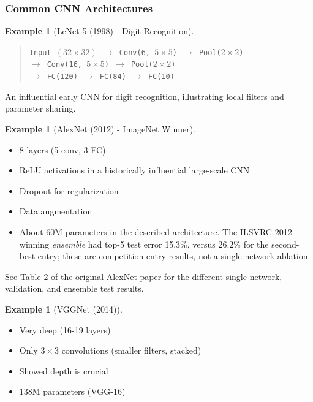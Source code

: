 \documentclass[11pt,twoside]{article}
\numberwithin{equation}{section}
\theoremstyle{plain}
\theoremstyle{definition}
\newtheorem{example}[theorem]{Example}
\theoremstyle{remark}
\begin{document}
\subsubsection{Common CNN Architectures}

\begin{example}[LeNet-5 (1998) - Digit Recognition]
\begin{quote}\footnotesize
\texttt{Input $(32\times32)$ $\to$ Conv(6, $5\times5$) $\to$ Pool($2\times2$)}\\
\texttt{$\to$ Conv(16, $5\times5$) $\to$ Pool($2\times2$)}\\
\texttt{$\to$ FC(120) $\to$ FC(84) $\to$ FC(10)}
\end{quote}

An influential early CNN for digit recognition, illustrating local filters and parameter sharing.
\end{example}

\begin{example}[AlexNet (2012) - ImageNet Winner]
\begin{itemize}
\item 8 layers (5 conv, 3 FC)
\item ReLU activations in a historically influential large-scale CNN
\item Dropout for regularization
\item Data augmentation
\item About 60M parameters in the described architecture. The ILSVRC-2012 winning \emph{ensemble} had top-5 test error 15.3\%, versus 26.2\% for the second-best entry; these are competition-entry results, not a single-network ablation
\end{itemize}
See Table 2 of the \href{https://papers.neurips.cc/paper_files/paper/2012/file/c399862d3b9d6b76c8436e924a68c45b-Paper.pdf}{original AlexNet paper} for the different single-network, validation, and ensemble test results.
\end{example}

\begin{example}[VGGNet (2014)]
\begin{itemize}
\item Very deep (16-19 layers)
\item Only $3 \times 3$ convolutions (smaller filters, stacked)
\item Showed depth is crucial
\item 138M parameters (VGG-16)
\end{itemize}
\end{example}
\end{document}
